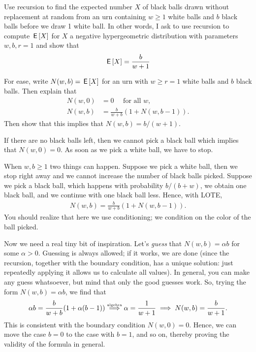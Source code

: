 \documentclass[lectures]{subfiles}
\begin{document}
\begin{exercise}
Use recursion to find the expected number $X$ of black balls drawn without replacement at random from an urn containing $w\geq 1$ white balls and $b$ black balls before we draw 1 white ball.
In other words, I ask to use recursion to compute $\,\mathsf{E}\left[X\right]$ for $X$ a negative hypergeometric distribution with parameters $w,b, r=1$ and show that
\begin{align}
  \label{eq:727}
\,\mathsf{E}\left[X\right] = \frac{b}{w+1}
\end{align}
\begin{hint}
For ease, write $N(w,b)= \,\mathsf{E}\left[X\right]$ for an  urn with $w\geq r = 1$ white balls and $b$ black balls. Then explain that
\begin{align}
N(w, 0) &= 0\quad \text{ for all $w$},\\
  N(w,b) &= \frac{b}{w+b} (1+N(w, b-1)).
\end{align}
Then show that this implies that $N(w,b) = b/ (w+1)$.
\end{hint}
\begin{solution}
If there are no black balls left, then we cannot pick a black ball which implies that $N(w, 0) = 0$.
As soon as we pick a white ball, we have to stop.

When $w, b \geq 1$ two things can happen.
Suppose we pick a white ball, then we stop right away and we cannot increase the number of black balls picked.
Suppose we pick a black ball, which happens with probability $b/(b+w)$, we obtain one black ball, and we continue with one black ball less.
Hence, with LOTE,
\begin{align}
  N(w,b) = \frac{b}{w+b} (1+N(w, b-1)).
\end{align}
You should realize that here we use conditioning; we condition on the color of the ball picked.

Now we need a real tiny bit of inspiration.
Let's \emph{guess} that $N(w,b)=\alpha b$ for some $\alpha>0$.
Guessing is always allowed; if it works, we are done (since the recursion, together with the boundary condition, has a unique solution: just repeatedly applying it allows us to calculate all values).
In general, you can make any guess whatsoever, but mind that only the good guesses work. So, trying the form $N(w,b) = \alpha b$, we find that
\begin{equation*}
\alpha b = \frac{b}{w+b} (1+ \alpha (b-1)) \stackrel{\textrm{\tiny algebra}}{\implies} \alpha = \frac{1}{w+1} \implies  N(w, b) = \frac{b }{w+1}.
\end{equation*}
This is consistent with the boundary condition $N(w,0)=0$. Hence, we can move the case $b=0$ to the case with $b=1$, and so on, thereby proving the validity of the formula in general.
\end{solution}
\end{exercise}
\end{document}

